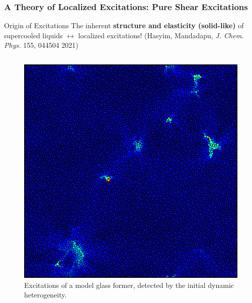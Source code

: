 \begin{frame}[c]\label{b.1}
\frametitle{A Theory of Localized Excitations: Pure Shear Excitations}

\vspace{-0.5em}
\begin{block}{\centering \large Origin of Excitations }
\centering The inherent \textbf{structure and elasticity (solid-like)} of supercooled liquids $\leftrightarrow$ localized excitations! {\footnotesize (Hasyim, Mandadapu,  \textit{J. Chem. Phys.} 155, 044504 2021)}
\end{block}
\vspace{-0.5em}
\begin{columns}[T]
\begin{column}[T]{0.4\textwidth}

\begin{figure}[t]

\begin{overprint}

\centering\includegraphics[width=0.85\linewidth]{b.1-exc_pureshear/zoomout_dispmag.png}\caption{Excitations of a model glass former, detected by the initial dynamic heterogeneity.}


\end{overprint}
\end{figure}
\end{column}
\end{columns}
\end{frame}
